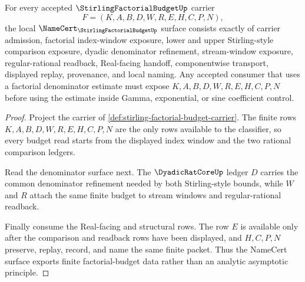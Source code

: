 \begin{theorem}
\label{thm:stirling-factorial-budget-namecert-obligations}
For every accepted $\StirlingFactorialBudgetUp$ carrier
$$
F=(K,A,B,D,W,R,E,H,C,P,N),
$$
the local $\NameCert_{\StirlingFactorialBudgetUp}$ surface consists exactly of carrier admission, factorial index-window exposure, lower and upper Stirling-style comparison exposure, dyadic denominator refinement, stream-window exposure, regular-rational readback, Real-facing handoff, componentwise transport, displayed replay, provenance, and local naming. Any accepted consumer that uses a factorial denominator estimate must expose $K,A,B,D,W,R,E,H,C,P,N$ before using the estimate inside Gamma, exponential, or sine coefficient control.
\end{theorem}
\begin{proof}
Project the carrier of \autoref{def:stirling-factorial-budget-carrier}. The finite rows $K,A,B,D,W,R,E,H,C,P,N$ are the only rows available to the classifier, so every budget read starts from the displayed index window and the two rational comparison ledgers.

Read the denominator surface next. The $\DyadicRatCoreUp$ ledger $D$ carries the common denominator refinement needed by both Stirling-style bounds, while $W$ and $R$ attach the same finite budget to stream windows and regular-rational readback.

Finally consume the Real-facing and structural rows. The row $E$ is available only after the comparison and readback rows have been displayed, and $H,C,P,N$ preserve, replay, record, and name the same finite packet. Thus the NameCert surface exports finite factorial-budget data rather than an analytic asymptotic principle.
\end{proof}

